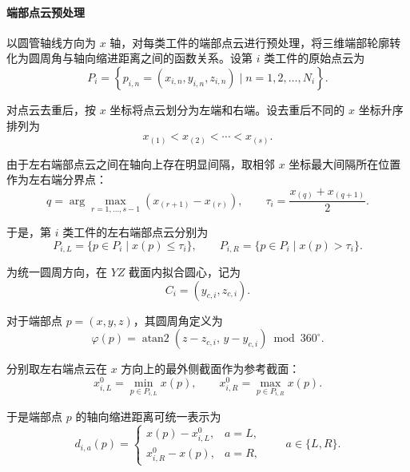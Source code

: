 \documentclass[UTF8]{ctexart}
\begin{document}
\paragraph{端部点云预处理}

以圆管轴线方向为 $x$ 轴，对每类工件的端部点云进行预处理，将三维端部轮廓转化为圆周角与轴向缩进距离之间的函数关系。设第 $i$ 类工件的原始点云为
\begin{equation}
P_i=\left\{p_{i,n}=(x_{i,n},y_{i,n},z_{i,n})\mid n=1,2,\ldots,N_i\right\}.
\label{eq:p2_pointcloud}
\end{equation}

对点云去重后，按 $x$ 坐标将点云划分为左端和右端。设去重后不同的 $x$ 坐标升序排列为
\begin{equation}
x_{(1)}<x_{(2)}<\cdots<x_{(s)}.
\label{eq:p2_xsort}
\end{equation}

由于左右端部点云之间在轴向上存在明显间隔，取相邻 $x$ 坐标最大间隔所在位置作为左右端分界点：
\begin{equation}
q=\arg\max_{r=1,\ldots,s-1}
\left(x_{(r+1)}-x_{(r)}\right),
\qquad
\tau_i=\frac{x_{(q)}+x_{(q+1)}}{2}.
\label{eq:p2_split}
\end{equation}

于是，第 $i$ 类工件的左右端部点云分别为
\begin{equation}
P_{i,L}=\{p\in P_i\mid x(p)\leq \tau_i\},
\qquad
P_{i,R}=\{p\in P_i\mid x(p)> \tau_i\}.
\label{eq:p2_lr_cloud}
\end{equation}

为统一圆周方向，在 $YZ$ 截面内拟合圆心，记为
\begin{equation}
C_i=(y_{c,i},z_{c,i}).
\label{eq:p2_center}
\end{equation}

对于端部点 $p=(x,y,z)$，其圆周角定义为
\begin{equation}
\varphi(p)=
\operatorname{atan2}\left(z-z_{c,i},\,y-y_{c,i}\right)\bmod 360^\circ .
\label{eq:p2_phi}
\end{equation}

分别取左右端点云在 $x$ 方向上的最外侧截面作为参考截面：
\begin{equation}
x_{i,L}^{0}=\min_{p\in P_{i,L}}x(p),
\qquad
x_{i,R}^{0}=\max_{p\in P_{i,R}}x(p).
\label{eq:p2_end_reference}
\end{equation}

于是端部点 $p$ 的轴向缩进距离可统一表示为
\begin{equation}
d_{i,a}(p)=
\begin{cases}
x(p)-x_{i,L}^{0}, & a=L,\\[4pt]
x_{i,R}^{0}-x(p), & a=R,
\end{cases}
\qquad a\in\{L,R\}.
\label{eq:p2_indent_distance}
\end{equation}
\end{document}
